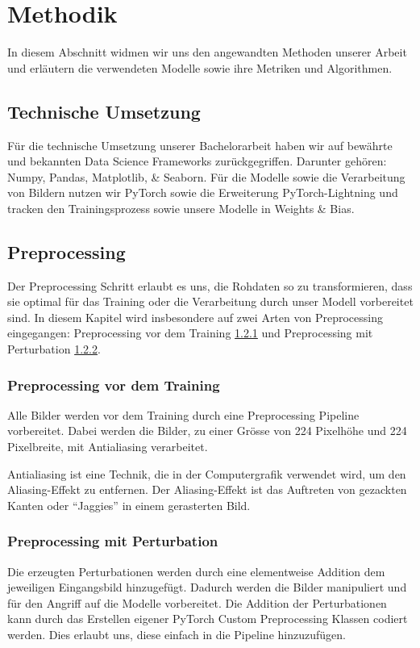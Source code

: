 \section{Methodik} 

In diesem Abschnitt widmen wir uns den angewandten Methoden unserer Arbeit und erläutern die verwendeten Modelle sowie ihre Metriken und Algorithmen.

\subsection{Technische Umsetzung}

Für die technische Umsetzung unserer Bachelorarbeit haben wir auf bewährte und bekannten Data Science Frameworks zurückgegriffen. Darunter gehören: Numpy, Pandas, Matplotlib, \& Seaborn. Für die Modelle sowie die Verarbeitung von Bildern nutzen wir PyTorch sowie die Erweiterung PyTorch-Lightning und tracken den Trainingsprozess sowie unsere Modelle in Weights \& Bias.

\subsection{Preprocessing}  \label{chap:preprocessing}

Der Preprocessing Schritt erlaubt es uns, die Rohdaten so zu transformieren, dass sie optimal für das Training oder die Verarbeitung durch unser Modell vorbereitet sind. In diesem Kapitel wird insbesondere auf zwei Arten von Preprocessing eingegangen: Preprocessing vor dem Training \ref{chap:Preprocessing vor dem Training} und Preprocessing mit Perturbation \ref{chap:Preprocessing mit Perturbation}.

\subsubsection{Preprocessing vor dem Training} \label{chap:Preprocessing vor dem Training}

Alle Bilder werden vor dem Training durch eine Preprocessing Pipeline vorbereitet. Dabei werden die Bilder, zu einer Grösse von 224 Pixelhöhe und 224 Pixelbreite, mit Antialiasing verarbeitet. 

Antialiasing ist eine Technik, die in der Computergrafik verwendet wird, um den Aliasing-Effekt zu entfernen. Der Aliasing-Effekt ist das Auftreten von gezackten Kanten oder "`Jaggies"' in einem gerasterten Bild.

\subsubsection{Preprocessing mit Perturbation} \label{chap:Preprocessing mit Perturbation}

Die erzeugten Perturbationen werden durch eine elementweise Addition dem jeweiligen Eingangsbild hinzugefügt. Dadurch werden die Bilder manipuliert und für den Angriff auf die Modelle vorbereitet. Die Addition der Perturbationen kann durch das Erstellen eigener PyTorch Custom Preprocessing Klassen codiert werden. Dies erlaubt uns, diese einfach in die Pipeline hinzuzufügen. 




